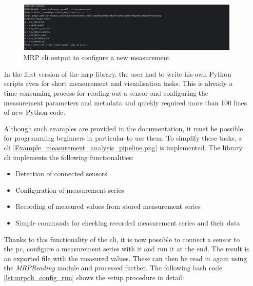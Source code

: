 \begin{figure}
\centering
\includegraphics{./generated_images/border_MRP_(+cli)_output_to_configure_a_new_measurement.png}
\caption{MRP \gls{cli} output to configure a new measurement
\label{MRP_(+cli)_output_to_configure_a_new_measurement.png}}
\end{figure}

In the first version of the \gls{mrp}-library, the user had to write his
own Python scripts even for short measurement and visualisation tasks.
This is already a time-consuming process for reading out a sensor and
configuring the measurement parameters and metadata and quickly required
more than 100 lines of new Python code.

Although such examples are provided in the documentation, it must be
possible for programming beginners in particular to use them. To
simplify these tasks, a \gls{cli}
\ref{Example_measurement_analysis_pipeline.png} is implemented. The
library \gls{cli} implements the following functionalities:

\begin{itemize}
\tightlist
\item
  Detection of connected sensors
\item
  Configuration of measurement series
\item
  Recording of measured values from stored measurement series
\item
  Simple commands for checking recorded measurement series and their
  data
\end{itemize}

Thanks to this functionality of the \gls{cli}, it is now possible to
connect a sensor to the \gls{pc}, configure a measurement series with it
and run it at the end. The result is an exported file with the measured
values. These can then be read in again using the \emph{MRPReading}
module and processed further. The following bash code
\ref{lst:mrpcli_config_run} shows the setup procedure in detail:

